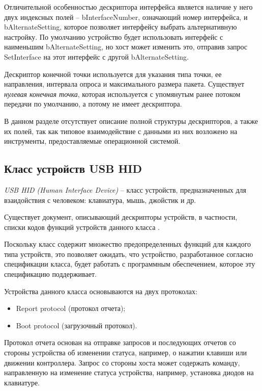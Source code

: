 Отличительной особенностью дескриптора интерфейса является наличие у него
двух индексных полей -- bInterfaceNumber, означающий номер интерфейса,
и bAlternateSetting, которое позволяет интерфейсу выбрать альтернативную настройку.
%
По умолчанию устройство будет использовать интерфейс с наименьшим bAlternateSetting,
но хост может изменить это, отправив запрос SetInterface 
на этот интерфейс с другой bAlternateSetting.

Дескриптор конечной точки используется для указания типа точки,
ее направления, интервала опроса и максимального размера пакета.
Существует \emph{нулевая конечная точка}, 
которая используется с упомянутым ранее потоком передачи по умолчанию,
а потому не имеет дескриптора.

В данном разделе отсутствует описание полной структуры дескрипторов,
а также их полей, так как типовое взаимодействие с данными из них возложено
на инструменты, предоставляемые операционной системой.

\subsection{Класс устройств USB HID}

\emph{USB HID (Human Interface Device)} -- класс устройств,
предназначенных для взаидойствия с человеком:
клавиатура, мышь, джойстик и др.

Существует документ, описывающий дескрипторы устройств,
в частности, списки кодов функций устройств данного класса \cite{hid}.

Поскольку класс содержит множество предопределенных функций для 
каждого типа устройств, это позволяет ожидать, что устройство,
разработанное согласно спецификации класса, будет работать с программным
обеспечением, которое эту спецификацию поддерживает.

Устройства данного класса основываются на двух протоколах: 
\begin{itemize}
    \item Report protocol (протокол отчета);
    \item Boot protocol (загрузочный протокол).
\end{itemize}

Протокол отчета основан на отправке запросов и последующих отчетов со стороны устройства
об изменении статуса, например, о нажатии клавиши или движении контроллера.
Запрос со стороны хоста может содержать команду, направленную на
изменение статуса устройства, например, установка диодов на клавиатуре.

